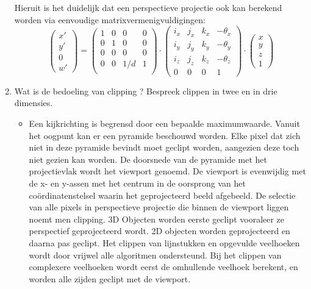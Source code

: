 \documentclass{report}
\newcommand{\vraag}[2]{
	\item #1
	
	#2
}
\begin{document}
\begin{enumerate}
{\begin{itemize}
		Hieruit is het duidelijk dat een perspectieve projectie ook kan berekend worden via eenvoudige matrixvermenigvuldigingen:
		$$
			\begin{pmatrix}
			x' \\ y' \\ 0 \\ w'
			\end{pmatrix}
			=
			\begin{pmatrix}
			1 & 0 & 0 & 0 \\
			0 & 1 & 0 & 0 \\
			0 & 0 & 0 & 0 \\
			0 & 0 & 1/d & 1 \\
			\end{pmatrix} 
			\cdot
			\begin{pmatrix}
			i_x & j_x & k_x & -\theta_x \\
			i_y & j_y & k_y & -\theta_y \\
			i_z & j_z & k_z & -\theta_z \\
			0 & 0 & 0 & 1
			\end{pmatrix}
			\cdot
			\begin{pmatrix}
			x \\ y \\ z \\ 1
			\end{pmatrix}
		$$
		\end{itemize}
	}
	
	\vraag{Wat is de bedoeling van clipping ? Bespreek clippen in twee en in drie dimensies. \accentuate{(§2.3 zonder deelparagrafen)}}{
		\begin{itemize} 
			\item Een kijkrichting is begrensd door een bepaalde maximumwaarde. Vanuit het oogpunt kan er een pyramide beschouwd worden. Elke pixel dat zich niet in deze pyramide bevindt moet geclipt worden, aangezien deze toch niet gezien kan worden. De doorsnede van de pyramide met het projectievlak wordt het viewport genoemd. De viewport is evenwijdig met de x- en y-assen met het centrum in de oorsprong van het coördinatenstelsel waarin het geprojecteerd beeld afgebeeld. De selectie van alle pixels in perspectieve projectie die binnen de viewport liggen noemt men clipping. 3D Objecten worden eerste geclipt vooraleer ze perspectief geprojecteerd wordt. 2D objecten worden geprojecteerd en daarna pas geclipt. Het clippen van lijnstukken en opgevulde veelhoeken wordt door vrijwel alle algoritmen ondersteund. Bij het clippen van complexere veelhoeken wordt eerst de omhullende veelhoek berekent, en worden alle zijden geclipt met de viewport.
		\end{itemize}}
	\end{enumerate}
\end{document}
